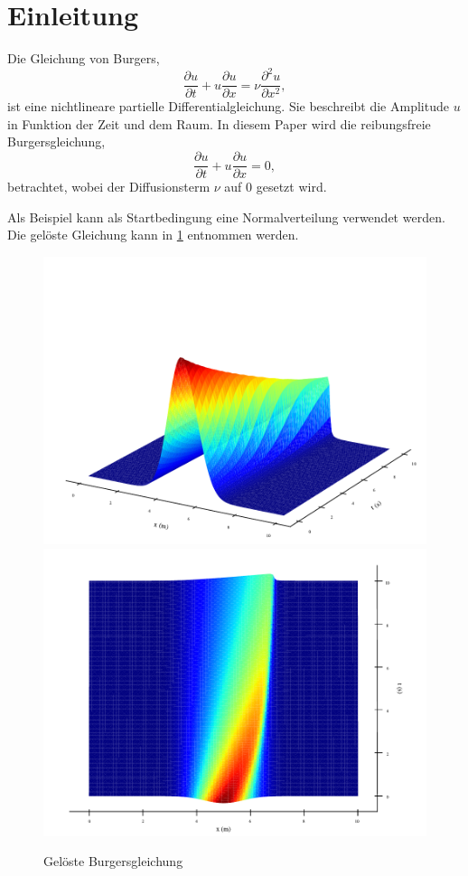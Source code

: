 %
%
\section{Einleitung \label{burgers:section:einleitung}}
	
	Die Gleichung von Burgers,
	\begin{equation}
		  \frac {\partial u}{\partial t}+u{\frac {\partial u}{\partial x}}=\nu {\frac {\partial ^{2}u}{\partial x^{2}}},
		  \label{burgers:eq_burgers}
	\end{equation}
	ist eine nichtlineare partielle Differentialgleichung.
	Sie beschreibt die Amplitude $u$ in Funktion der Zeit und dem Raum.
	In diesem Paper wird die reibungsfreie Burgersgleichung, 
	\begin{equation}
		\frac {\partial u}{\partial t}+u{\frac {\partial u}{\partial x}}=0,
		\label{burgers:eq_invisid_burgers}
	\end{equation}
	betrachtet, wobei der Diffusionsterm $\nu$ auf 0 gesetzt wird.
	
	Als Beispiel kann als Startbedingung eine Normalverteilung verwendet werden.
	Die gel\"oste Gleichung kann in \ref{burgers:fig:b1} entnommen werden.
	
	    \begin{figure}
		\centering
		\includegraphics[width=.49\textwidth]{papers/burgers/BurgersEquation/images/Implicit_front.pdf}
		\includegraphics[width=.49\textwidth]{papers/burgers/BurgersEquation/images/Implicit_top.pdf}
		\caption{Gel\"oste Burgersgleichung}
		\label{burgers:fig:b1}
		\end{figure}
	
